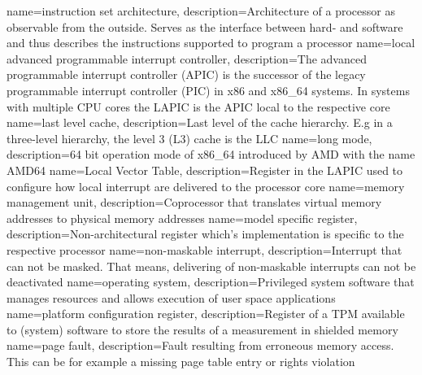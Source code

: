 {
  name=instruction set architecture,
  description={Architecture of a processor as observable from the outside. Serves as the interface between hard- and
  software and thus describes the instructions supported to program a processor}
}
%
{
  name=local advanced programmable interrupt controller,
  description={The advanced programmable interrupt controller (APIC) is the successor of the legacy programmable
    interrupt controller (PIC) in x86 and x86\_64 systems. In systems with multiple CPU cores the LAPIC is the
  APIC local to the respective core}
}
{
  name=last level cache,
  description={Last level of the cache hierarchy. E.g in a three-level hierarchy, the level 3 (L3) cache is the LLC}
}
{
  name=long mode,
  description={64 bit operation mode of x86\_64 introduced by AMD with the name AMD64}
}
{
  name=Local Vector Table,
  description={Register in the LAPIC used to configure how local interrupt are delivered to the processor core}
}
%
{
  name=memory management unit,
  description={Coprocessor that translates virtual memory addresses to physical memory addresses}
}
{
  name=model specific register,
  description={Non-architectural register which's implementation is specific to the respective processor}
}
%
{
  name=non-maskable interrupt,
  description={Interrupt that can not be masked. That means, delivering of non-maskable interrupts can not be
  deactivated}
}
%
{
  name=operating system,
  description={Privileged system software that manages resources and allows execution of user space applications}
}
%
{
  name=platform configuration register,
  description={Register of a TPM available to (system) software to store the results of a measurement in shielded
  memory}
}
{
  name=page fault,
  description={Fault resulting from erroneous memory access. This can be for example a missing page table entry or
  rights violation}
}
